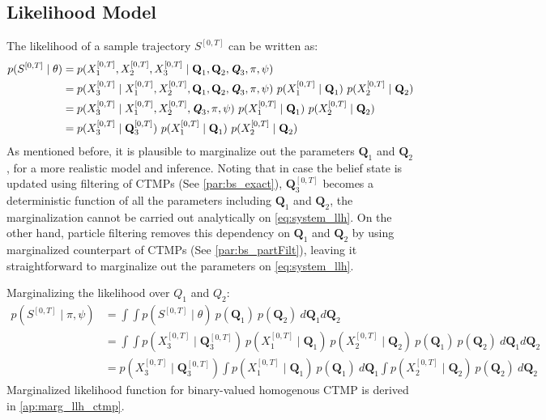 \subsection{Likelihood Model}
 The likelihood of a sample trajectory $ S^{[0,T]} $ can be written as:
\begin{align}
p(S^{[0,T]} \mid \theta ) & = p(X_{1}^{[0, T]}, X_{2}^{[0, T]}, X_{3}^{[0, T]} \mid \textbf{Q}_{1}, \textbf{Q}_{2}, \textit{\textbf{Q}}_3, \pi, \psi) \nonumber\\
& = p(X_{3}^{[0, T]} \mid X_{1}^{[0, T]}, X_{2}^{[0, T]}, \textbf{Q}_{1}, \textbf{Q}_{2}, \textit{\textbf{Q}}_3, \pi, \psi) \ p(X_{1}^{[0, T]}\mid \textbf{Q}_{1}) \ p(X_{2}^{[0, T]}\mid \textbf{Q}_{2}) \nonumber\\ & = p(X_{3}^{[0, T]} \mid X_{1}^{[0, T]}, X_{2}^{[0, T]}, \textit{\textbf{Q}}_3, \pi, \psi) \ p(X_{1}^{[0, T]}\mid \textbf{Q}_{1}) \ p(X_{2}^{[0, T]}\mid \textbf{Q}_{2}) \nonumber\\ & = p(X_{3}^{[0, T]}\mid \textbf{Q}_{3}^{[0, T]}) \ p(X_{1}^{[0, T]}\mid \textbf{Q}_{1}) \ p(X_{2}^{[0, T]}\mid \textbf{Q}_{2}) 
\label{eq:system_llh}
\end{align}
As mentioned before, it is plausible to marginalize out the parameters $ \textbf{Q}_1 $ and $ \textbf{Q}_2 $, for a more realistic model and inference. Noting that in case the belief state is updated using filtering of CTMPs (See \cref{par:bs_exact}), $ \textbf{Q}_{3}^{[0, T]} $ becomes a deterministic function of all the parameters including $ \textbf{Q}_1 $ and $ \textbf{Q}_2 $, the marginalization cannot be carried out analytically on \autoref{eq:system_llh}. On the other hand, particle filtering removes this dependency on $ \textbf{Q}_1 $ and $ \textbf{Q}_2 $ by using marginalized counterpart of CTMPs (See \cref{par:bs_partFilt}), leaving it straightforward to marginalize out the parameters on \autoref{eq:system_llh}.

Marginalizing the likelihood over $ Q_{1} $ and $ Q_{2} $:
\begin{align}
p(S^{[0,T]} \mid \pi, \psi ) & = 	\int \int p(S^{[0,T]} \mid \theta ) \ p(\textbf{Q}_{1}) \ p(\textbf{Q}_{2}) \ d\textbf{Q}_{1}d\textbf{Q}_{2} \nonumber\\ 
& = \int \int p(X_{3}^{[0, T]}\mid \textbf{Q}_{3}^{[0, T]}) \ p(X_{1}^{[0, T]}\mid \textbf{Q}_{1}) \ p(X_{2}^{[0, T]}\mid \textbf{Q}_{2}) \ p(\textbf{Q}_{1}) \ p(\textbf{Q}_{2})\ d\textbf{Q}_{1}d\textbf{Q}_{2} \nonumber\\ 
& = p(X_{3}^{[0, T]}\mid \textbf{Q}_{3}^{[0, T]}) \int  p(X_{1}^{[0, T]}\mid \textbf{Q}_{1}) \ p(\textbf{Q}_{1}) \ d\textbf{Q}_{1} \int p(X_{2}^{[0, T]}\mid \textbf{Q}_{2})\ p(\textbf{Q}_{2})\ d\textbf{Q}_{2}
\label{eq:Marg_llh}
\end{align}
Marginalized likelihood function for binary-valued homogenous CTMP is derived in \autoref{ap:marg_llh_ctmp}.

